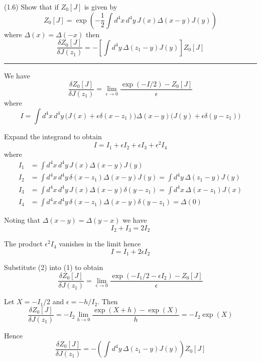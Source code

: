 \documentclass[12pt]{article}
\begin{document}
(1.6)
Show that if $Z_0[J]$ is given by
\begin{equation*}
Z_0[J]=\exp\left(
-\frac{1}{2}\int d^4x\,d^4y\,J(x)\Delta(x-y)J(y)
\right)
\tag{1.49}
\end{equation*}
where $\Delta(x)=\Delta(-x)$ then
\begin{equation*}
\frac{\delta Z_0[J]}{\delta J(z_1)}
=-\left[
\int d^4y\,\Delta(z_1-y)J(y)
\right]Z_0[J]
\tag{1.50}
\end{equation*}

\bigskip
\hrule

\bigskip
We have
\begin{equation*}
\frac{\delta Z_0[J]}{\delta J(z_1)}=\lim_{\epsilon\rightarrow0}
\frac{\exp(-I/2)-Z_0[J]}{\epsilon}
\tag{1}
\end{equation*}
where
\begin{equation*}
I=\int d^4x\,d^4y\,
\big(J(x)+\epsilon\delta(x-z_1)\big)
\Delta(x-y)
\big(J(y)+\epsilon\delta(y-z_1)\big)
\end{equation*}

Expand the integrand to obtain
\begin{equation*}
I=I_1+\epsilon I_2+\epsilon I_3+\epsilon^2 I_4
\end{equation*}
where
\begin{align*}
I_1&=\int d^4x\,d^4y\,J(x)\Delta(x-y)J(y)
\\
I_2&=\int d^4x\,d^4y\,\delta(x-z_1)\Delta(x-y)J(y)=\int d^4y\,\Delta(z_1-y)J(y)
\\
I_3&=\int d^4x\,d^4y\,J(x)\Delta(x-y)\delta(y-z_1)=\int d^4x\,\Delta(x-z_1)J(x)
\\
I_4&=\int d^4x\,d^4y\,\delta(x-z_1)\Delta(x-y)\delta(y-z_1)=\Delta(0)
\end{align*}

Noting that $\Delta(x-y)=\Delta(y-x)$ we have
\begin{equation*}
I_2+I_3=2I_2
\end{equation*}

The product $\epsilon^2I_4$ vanishes in the limit hence
\begin{equation*}
I=I_1+2\epsilon I_2
\tag{2}
\end{equation*}

Substitute (2) into (1) to obtain
\begin{equation*}
\frac{\delta Z_0[J]}{\delta J(z_1)}=\lim_{\epsilon\rightarrow0}
\frac{\exp(-I_1/2-\epsilon I_2)-Z_0[J]}{\epsilon}
\end{equation*}

Let $X=-I_1/2$ and $\epsilon=-h/I_2$.
Then
\begin{equation*}
\frac{\delta Z_0[J]}{\delta J(z_1)}=-I_2\lim_{h\rightarrow0}
\frac{\exp(X+h)-\exp(X)}{h}
=-I_2\exp(X)
\end{equation*}

Hence
\begin{equation*}
\frac{\delta Z_0[J]}{\delta J(z_1)}=-\left(\int d^4y\,\Delta(z_1-y)J(y)\right)Z_0[J]
\end{equation*}
\end{document}

